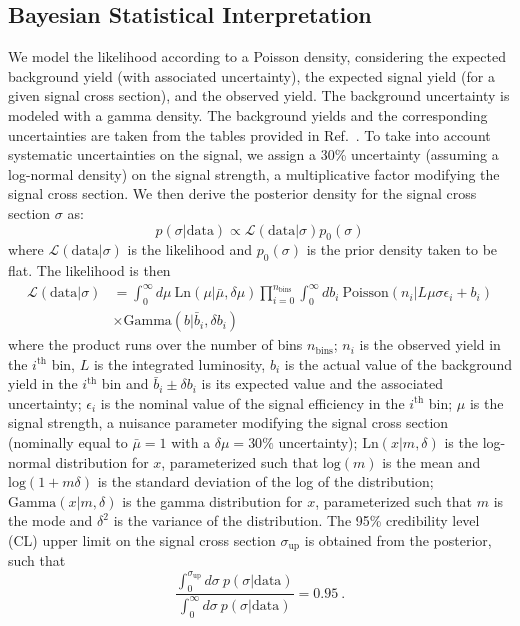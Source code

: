 \subsection{Bayesian Statistical Interpretation}
We model the likelihood according to a Poisson density,
considering the expected background yield (with associated
uncertainty), the expected signal yield (for a given signal cross
section), and the observed yield. The background uncertainty is modeled with a gamma density. The
background yields and the corresponding uncertainties are taken from the tables provided
in Ref.~\cite{RazorHgaga}. To take into account systematic
uncertainties on the signal, we assign a 30\% uncertainty (assuming a
log-normal density) on the signal strength, a multiplicative
factor modifying the signal cross section. We then derive the
posterior density for the signal cross section $\sigma$ as:
\begin{equation}
p(\sigma|\mathrm{data}) \propto \mathcal L(\mathrm{data} |\sigma)p_0(\sigma)
\label{eqn:posterior}
\end{equation}
where $\mathcal L(\mathrm{data} |\sigma)$ is the likelihood and $p_0(\sigma)$ is the prior density taken to be
flat. The likelihood is then
\begin{align}
\mathcal L(\mathrm{data} |\sigma) &=\int_{0}^{\infty}d\mu~\mathrm{Ln}(\mu|\bar\mu,\delta\mu)\prod_{i=0}^{n_{\mathrm{bins}}}\int_0^{\infty} db_i~
   \mathrm{Poisson}(n_i|L\mu\sigma\epsilon_i+ b_i)\nonumber\\
&\times\mathrm{Gamma}(b|\bar{b}_i,\delta b_i)
\label{eqn:likelihood}
\end{align}
where the product runs over the number of bins $n_{\mathrm{bins}}$; $n_i$ is the
observed yield in the $i^{\mathrm{th}}$ bin, $L$ is the integrated
luminosity, $b_i$ is the actual value of the background yield in the
$i^{\mathrm{th}}$ bin and $\bar{b}_i\pm \delta b_i$ is its expected value
and the associated uncertainty; $\epsilon_i$ is the nominal value
of the signal efficiency in the $i^{\mathrm{th}}$ bin; $\mu$ is the
signal strength, a nuisance parameter modifying the signal cross section
(nominally equal to $\bar\mu=1$ with a $\delta\mu=30\%$ uncertainty);
$\mathrm{Ln}(x|m,\delta)$ is the log-normal
distribution for $x$, parameterized such that $\mathrm{log}(m)$ is the
mean and $\mathrm{log}(1+m\delta)$ is the standard deviation of the
log of the distribution; $\mathrm{Gamma}(x|m,\delta)$ is the gamma
distribution for $x$, parameterized such that $m$ is the
mode and $\delta^2$ is the variance of the distribution. The 95\%
credibility level (CL) upper limit on the
signal cross section $\sigma_{\mathrm{up}}$ is obtained from the
posterior, such that 
\begin{equation}
\frac{\int_0^{\sigma_{\mathrm{up}}}d\sigma~ p(\sigma|\mathrm{data})}{\int_0^{\infty}d\sigma~ p(\sigma|\mathrm{data})} = 0.95~.
\end{equation}

